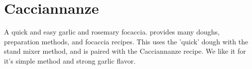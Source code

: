 \section{Cacciannanze}%


\begin{recipestats}[
    servings=12,
    preptime=45~\minute,
    bakingtime=20~\minute,
    inactivetime=3~\hour,
    original=\citefield{caraccioloPizza}{shorttitle}~\cite{caraccioloPizza},
]
\end{recipestats}


\begin{recipeabstract}
    A quick and easy garlic and rosemary focaccia.
    \citeauthor{caraccioloPizza} provides many doughs, preparation methods, and focaccia recipes.
    This uses the 'quick' \cite[p.~83]{caraccioloPizza} dough with the stand mixer method,
    and is paired with the Cacciannanze \cite[p.~178]{caraccioloPizza} recipe.
    We like it for it's simple method and strong garlic flavor.
\end{recipeabstract}


\begin{ingredientcolumns}
    \begin{ingredientblock}[dough]
        \\
        \\
        \\
        \\
        \\
        \\
    \end{ingredientblock}
    \begin{ingredientblock}[topping]
        \\
        \\
        \\
        \\
    \end{ingredientblock}
\end{ingredientcolumns}


